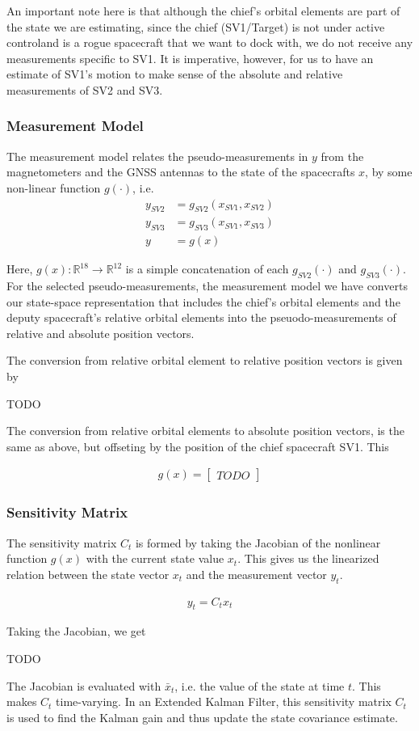An important note here is that although the chief's orbital elements are part of the state we are estimating, since the chief (SV1/Target) is not under active controland is a rogue spacecraft that we want to dock with, we do not receive any measurements specific to SV1. It is imperative, however, for us to have an estimate of SV1's motion to make sense of the absolute and relative measurements of SV2 and SV3.

\subsubsection{Measurement Model}
The measurement model relates the pseudo-measurements in $y$ from the magnetometers and the GNSS antennas to the state of the spacecrafts $x$, by some non-linear function $g(\cdot)$, i.e.
\begin{align}
    y_{SV2} &= g_{SV2}(x_{SV1}, x_{SV2}) \\
    y_{SV3} &= g_{SV3}(x_{SV1}, x_{SV3}) \\
    y &= g(x)
\end{align}

Here, $g(x):\mathbb{R}^{18} \rightarrow \mathbb{R}^{12}$ is a simple concatenation of each $g_{SV2}(\cdot)$ and $g_{SV3}(\cdot)$. For the selected pseudo-measurements, the measurement model we have converts our state-space representation that includes the chief's orbital elements and the deputy spacecraft's relative orbital elements into the pseuodo-measurements of relative and absolute position vectors.

The conversion from relative orbital element to relative position vectors is given by 

TODO

The conversion from relative orbital elements to absolute position vectors, is the same as above, but offseting by the position of the chief spacecraft SV1. This 

\begin{align}
    g(x) = \begin{bmatrix}
        TODO
    \end{bmatrix}
\end{align}

\subsubsection{Sensitivity Matrix}

The sensitivity matrix $C_t$ is formed by taking the Jacobian of the nonlinear function $g(x)$ with the current state value $x_t$. This gives us the linearized relation between the state vector $x_t$ and the measurement vector $y_t$.

\begin{align}
    y_t = C_tx_t
\end{align}

Taking the Jacobian, we get

TODO

The Jacobian is evaluated with $\bar{x}_t$, i.e. the value of the state at time $t$. This makes $C_t$ time-varying. In an Extended Kalman Filter, this sensitivity matrix $C_t$ is used to find the Kalman gain and thus update the state covariance estimate.